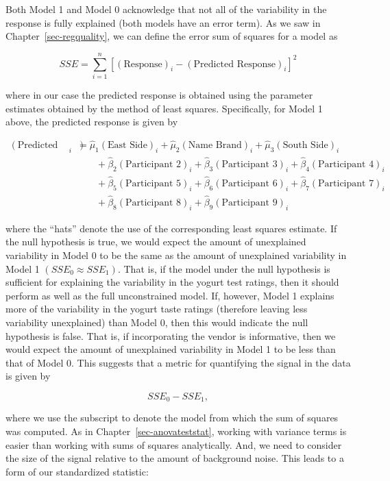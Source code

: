 \documentclass[
  letterpaper,
  DIV=11,
  numbers=noendperiod]{scrreprt}
\theoremstyle{plain}
\theoremstyle{definition}
\theoremstyle{definition}
\theoremstyle{remark}
\begin{document}
Both Model 1 and Model 0 acknowledge that not all of the variability in
the response is fully explained (both models have an error term). As we
saw in Chapter~\ref{sec-regquality}, we can define the error sum of
squares for a model as

\[SSE = \sum_{i=1}^{n} \left[(\text{Response})_i - (\text{Predicted Response})_i\right]^2\]

where in our case the predicted response is obtained using the parameter
estimates obtained by the method of least squares. Specifically, for
Model 1 above, the predicted response is given by

\[
\begin{aligned}
  (\text{Predicted Response})_i &= \widehat{\mu}_1 (\text{East Side})_i + \widehat{\mu}_2 (\text{Name Brand})_i + \widehat{\mu}_3 (\text{South Side})_i \\
    &\qquad + \widehat{\beta}_2 (\text{Participant 2})_i + \widehat{\beta}_3 (\text{Participant 3})_i + \widehat{\beta}_4 (\text{Participant 4})_i \\
    &\qquad + \widehat{\beta}_5 (\text{Participant 5})_i + \widehat{\beta}_6 (\text{Participant 6})_i + \widehat{\beta}_7 (\text{Participant 7})_i \\
    &\qquad + \widehat{\beta}_8 (\text{Participant 8})_i + \widehat{\beta}_9 (\text{Participant 9})_i 
\end{aligned}
\]

where the ``hats'' denote the use of the corresponding least squares
estimate. If the null hypothesis is true, we would expect the amount of
unexplained variability in Model 0 to be the same as the amount of
unexplained variability in Model 1 \(\left(SSE_0 \approx SSE_1\right)\).
That is, if the model under the null hypothesis is sufficient for
explaining the variability in the yogurt test ratings, then it should
perform as well as the full unconstrained model. If, however, Model 1
explains more of the variability in the yogurt taste ratings (therefore
leaving less variability unexplained) than Model 0, then this would
indicate the null hypothesis is false. That is, if incorporating the
vendor is informative, then we would expect the amount of unexplained
variability in Model 1 to be less than that of Model 0. This suggests
that a metric for quantifying the signal in the data is given by

\[SSE_0 - SSE_1,\]

where we use the subscript to denote the model from which the sum of
squares was computed. As in Chapter~\ref{sec-anovateststat}, working
with variance terms is easier than working with sums of squares
analytically. And, we need to consider the size of the signal relative
to the amount of background noise. This leads to a form of our
standardized statistic:
\end{document}
